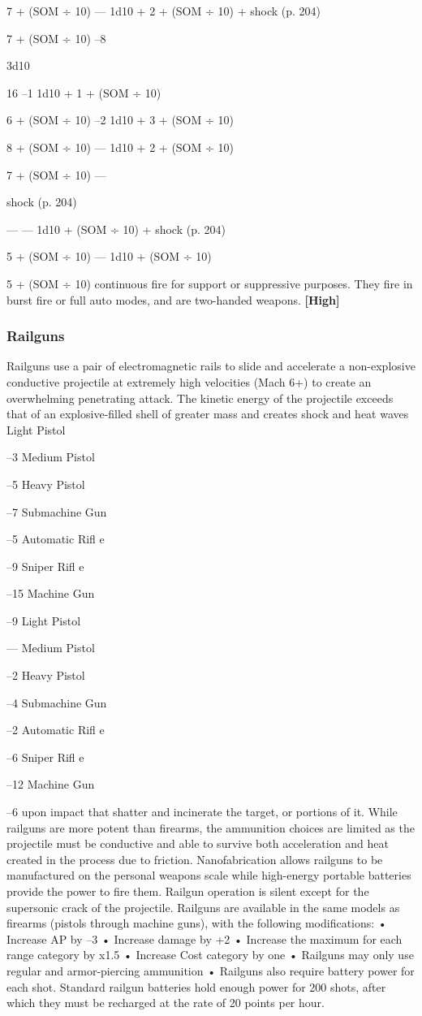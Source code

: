 7 + (SOM ÷ 10)
—
1d10 + 2 + (SOM ÷ 10) + shock (p. 204)

7 + (SOM ÷ 10)
–8

3d10

16
–1
1d10 + 1 + (SOM ÷ 10) 

6 + (SOM ÷ 10)
–2
1d10 + 3 + (SOM ÷ 10) 

8 + (SOM ÷ 10)
—
1d10 + 2 + (SOM ÷ 10) 

7 + (SOM ÷ 10)
—

shock (p. 204)

—
—
1d10 + (SOM ÷ 10) + shock (p. 204)

5 + (SOM ÷ 10)
—
1d10 + (SOM ÷ 10)

5 + (SOM ÷ 10)
continuous fire for support or suppressive purposes. 
They fire in burst fire or full auto modes, and are two-handed
weapons. \textbf{[High]}

\subsubsection{Railguns}

Railguns use a pair of electromagnetic rails to slide 
and accelerate a non-explosive conductive projectile at 
extremely high velocities (Mach 6+) to create an overwhelming
penetrating attack. The kinetic energy of
the projectile exceeds that of an explosive-filled shell 
of greater mass and creates shock and heat waves 
Light Pistol

–3
Medium Pistol

–5
Heavy Pistol

–7
Submachine Gun

–5
Automatic Riﬂ e

–9
Sniper Riﬂ e

–15
Machine Gun

–9
Light Pistol

—
Medium Pistol

–2
Heavy Pistol

–4
Submachine Gun

–2
Automatic Riﬂ e

–6
Sniper Riﬂ e

–12
Machine Gun

–6
upon impact that shatter and incinerate the target, or 
portions of it. While railguns are more potent than 
firearms, the ammunition choices are limited as the 
projectile must be conductive and able to survive 
both acceleration and heat created in the process due 
to friction. Nanofabrication allows railguns to be 
manufactured on the personal weapons scale while 
high-energy portable batteries provide the power to 
fire them. Railgun operation is silent except for the 
supersonic crack of the projectile.
Railguns are available in the same models as firearms
(pistols through machine guns), with the following
modifications:
•  Increase AP by –3
•  Increase damage by +2
•  Increase the maximum for each range category 
by x1.5
•  Increase Cost category by one
• Railguns may only use regular and armor-piercing
ammunition
•  Railguns also require battery power for each shot. 
Standard railgun batteries hold enough power for 
200 shots, after which they must be recharged at 
the rate of 20 points per hour.

